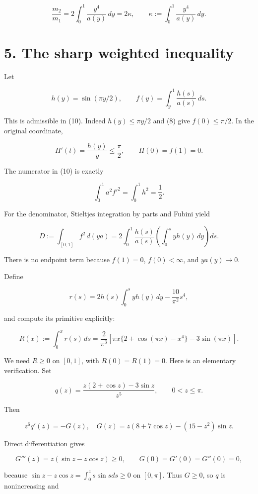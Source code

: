 \documentclass[11pt,a4paper]{article}
\begin{document}
\[
 \frac{m_2}{m_1}
 =2\int_0^1\frac{y^4}{a(y)}\,dy=2\kappa,
 \qquad
 \kappa:=\int_0^1\frac{y^4}{a(y)}\,dy.
 \tag{11}
\]

\hypertarget{1028-the-sharp-weighted-inequality}{%
\section{5. The sharp weighted
inequality}\label{1028-the-sharp-weighted-inequality}}

Let

\[
 h(y)=\sin(\pi y/2),\qquad
 f(y)=\int_y^1\frac{h(s)}{a(s)}\,ds.
 \tag{12}
\]

This is admissible in (10). Indeed \(h(y)\le \pi y/2\) and (8) give
\(f(0)\le \pi /2\). In the original coordinate,

\[
 H'(t)=\frac{h(y)}{y}\le\frac\pi2,
 \qquad H(0)=f(1)=0.
\]

The numerator in (10) is exactly

\[
 \int_0^1a^2 f'^2=\int_0^1h^2=\frac12.
 \tag{13}
\]

For the denominator, Stieltjes integration by parts and Fubini yield

\[
 D:=\int_{[0,1]}f^2\,d(ya)
   =2\int_0^1\frac{h(s)}{a(s)}
                  \left(\int_0^s y h(y)\,dy\right)ds.
 \tag{14}
\]

There is no endpoint term because \(f(1)=0\), \(f(0)<\infty\), and
\(ya(y)\to 0\).

Define

\[
 r(s)=2h(s)\int_0^s yh(y)\,dy-\frac{10}{\pi^2}s^4,
\]

and compute its primitive explicitly:

\[
 R(x):=\int_0^x r(s)\,ds
   =\frac{2}{\pi^3}
     \left[\pi x\{2+\cos(\pi x)-x^4\}-3\sin(\pi x)\right].
 \tag{15}
\]

We need \(R\ge 0\) on \([0,1]\), with \(R(0)=R(1)=0\). Here is an
elementary verification. Set

\[
 q(z)=\frac{z(2+\cos z)-3\sin z}{z^5},\qquad 0<z\le\pi.
\]

Then

\[
 z^6 q'(z)=-G(z),\quad
 G(z)=z(8+7\cos z)-(15-z^2)\sin z.
\]

Direct differentiation gives

\[
 G'''(z)=z(\sin z-z\cos z)\ge0,
 \qquad G(0)=G'(0)=G''(0)=0,
\]

because \(\sin z-z \cos z=\int _0^z s \sin s ds\ge 0\) on \([0,\pi ]\).
Thus \(G\ge 0\), so \(q\) is nonincreasing and
\end{document}
